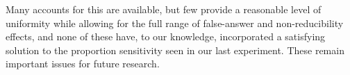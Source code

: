 \documentclass[a4paper]{article}
\begin{document}
Many accounts for this are available, but few provide a reasonable level of uniformity while allowing for the full range of false-answer and non-reducibility effects, and none of these have, to our knowledge, incorporated a satisfying solution to the proportion sensitivity seen in our last experiment. These remain important issues for future research.



\end{document}
